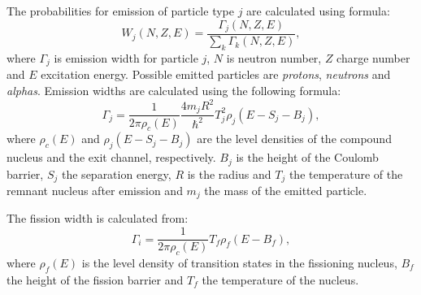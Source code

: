 The probabilities for emission of particle type $j$ are calculated using
formula:
\begin{equation}
W_j(N,Z,E) = \frac{\Gamma_j(N,Z,E)}{\sum_k\Gamma_k(N,Z,E)},
\label{eqn:probabilities}
\end{equation}
where $\Gamma_j$ is emission width for particle $j$, $N$ is neutron
number, $Z$ charge number and $E$ excitation energy. Possible emitted
particles are \emph{protons}, \emph{neutrons} and \emph{alphas}.
Emission widths are calculated using the following formula:
\begin{equation}
\Gamma_j = \frac{1}{2 \pi \rho_c(E)} \frac{4 m_j R^2}{\hbar^2} T_j^2 \rho_j(E - S_j - B_j),
\label{eqn:emissionwidth}
\end{equation}
where $\rho_c(E)$ and $\rho_j(E - S_j - B_j)$ are the level densities
of the compound nucleus and the exit channel, respectively. $B_j$ is
the height of the Coulomb barrier, $S_j$ the separation energy, $R$ is
the radius and $T_j$ the temperature of the remnant nucleus after
emission and $m_j$ the mass of the emitted particle.

The fission width is calculated from:
\begin{equation}
\Gamma_i = \frac{1}{2 \pi \rho_c(E)}T_f \rho_f(E - B_f),
\label{eqn:fissionwidth}
\end{equation}
where $\rho_f(E)$ is the level density of transition states in the
fissioning nucleus, $B_f$ the height of the fission barrier and $T_f$
the temperature of the nucleus.


